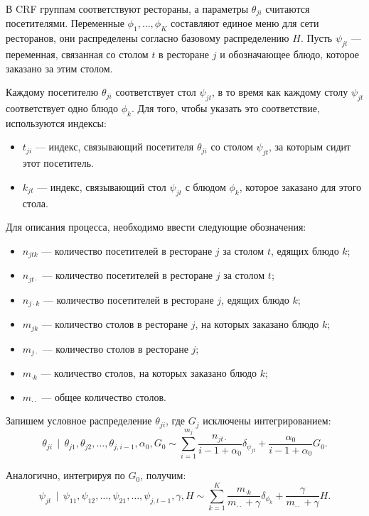 \documentclass[12pt, a4paper]{article}
\DeclareMathOperator{\svert}{\,\vert\,}
\begin{document}
  В CRF группам соответствуют рестораны, а параметры $\theta_{ji}$ считаются посетителями. Переменные $\phi_1, \ldots, \phi_K$ составляют единое меню для сети ресторанов, они распределены согласно базовому распределению $H$. Пусть $\psi_{jt}$ --- переменная, связанная со столом $t$ в ресторане $j$ и обозначающее блюдо, которое заказано за этим столом.
  
  Каждому посетителю $\theta_{ji}$ соответствует стол $\psi_{jt}$, в то время как каждому столу $\psi_{jt}$ соответствует одно блюдо $\phi_k$. Для того, чтобы указать это соответствие, используются индексы:
  \begin{itemize}
  	\item $t_{ji}$ --- индекс, связывающий посетителя $\theta_{ji}$ со столом $\psi_{jt}$, за которым сидит этот посетитель.
  	\item $k_{jt}$ --- индекс, связывающий стол $\psi_{jt}$ с блюдом $\phi_k$, которое заказано для этого стола.
  \end{itemize}
  Для описания процесса, необходимо ввести следующие обозначения:
  \begin{itemize}
  \item $n_{jtk}$ --- количество посетителей в ресторане $j$ за столом $t$, едящих блюдо $k$;
  \item $n_{jt\cdot}$ --- количество посетителей в ресторане $j$ за столом $t$;
  \item $n_{j\cdot k}$ --- количество посетителей в ресторане $j$, едящих блюдо $k$;
  \item $m_{jk}$ --- количество столов в ресторане $j$, на которых заказано блюдо $k$;
  \item $m_{j\cdot}$ --- количество столов в ресторане $j$;
  \item $m_{\cdot k}$ --- количество столов, на которых заказано блюдо $k$;
  \item $m_{\cdot \cdot}$ --- общее количество столов.
  \end{itemize}
  
  Запишем условное распределение $\theta_{ji}$, где $G_j$ исключены интегрированием:
  \begin{equation}
  \label{eq:1}
  \theta_{ji} \svert \theta_{j1}, \theta_{j2}, \ldots, \theta_{j,i-1}, \alpha_0, G_0 \sim
  \sum \limits_{i=1}^{m_j} \frac{n_{j t \cdot}}{i - 1 + \alpha_0} \delta_{\psi_{jt}} + \frac{\alpha_0}{i - 1 + \alpha_0} G_0.
  \end{equation}
  
  Аналогично, интегрируя по $G_0$, получим:
  \begin{equation}
  \label{eq:2}
  \psi_{jt} \svert \psi_{11}, \psi_{12}, \ldots, \psi_{21}, \ldots, \psi_{j, t-1}, \gamma, H \sim
  \sum \limits_{k=1}^{K} \frac{m_{\cdot k}}{m_{\cdot \cdot} + \gamma} \delta_{\phi_k} + \frac{\gamma}{m_{\cdot \cdot} + \gamma} H.
  \end{equation}
  
\end{document}
